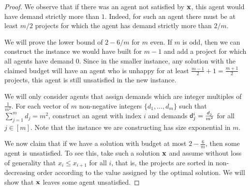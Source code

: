 \documentclass{article}
\begin{document}
\begin{proof}

We observe that if there was an agent not satisfied by ${\bf x}$,  
this agent would have demand strictly more than $1$. Indeed, for such an agent there must be at least $m/2$ projects for which the agent has demand strictly more
than ${2}/{m}$.  %



We will prove the lower bound of $2-6/m$ %
for $m$ even. If $m$ is odd, then we can construct
the instance we would have built for $m-1$ and add a project for which all
agents have demand $0$. Since in the smaller instance, any solution with the
claimed budget will have an agent who is unhappy for at least $\frac{m-1}{2}+1
= \frac{m+1}{2}$ projects, this agent is still unsatisfied in the new instance.

We will only consider agents that assign demands which are integer multiples of
$\frac{1}{m^2}$. For each vector  of $m$ non-negative integers $\{d_1,\ldots,d_m\}$
such that $\sum_{j=1}^m d_j = m^2$, construct an agent with index $i$ and demands ${\sf d}^i_j =
\frac{d_j}{m^2}$ for all $j\in[m]$. Note that the instance we are constructing has size
exponential in $m$. 


We now claim that if we have a solution with budget at most $2-\frac{6}{m}$,
then some agent is unsatisfied. To see this, take such a solution ${\bf x}$
and assume without loss of generality that $x_i\le x_{i+1}$ for all $i$, that
is, the projects are sorted in non-decreasing order according to the value
assigned by the optimal solution. We will show that ${\bf x}$ leaves some agent unsatisfied. 



\end{proof}
\end{document}
